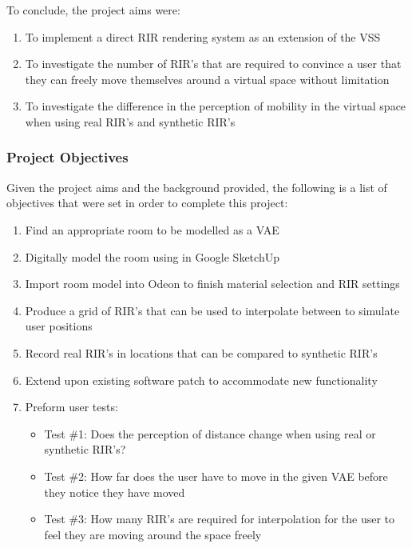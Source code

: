 \documentclass[../../main.tex]{subfiles}
\begin{document}
		To conclude, the project aims were:

		\begin{enumerate}
			\item To implement a direct \ac{RIR} rendering system as an extension of the \ac{VSS}

			\item To investigate the number of \ac{RIR}'s that are required to convince a user that they can freely move themselves around a virtual space without limitation

			\item To investigate the difference in the perception of mobility in the virtual space when using real \ac{RIR}'s and synthetic \ac{RIR}'s
		\end{enumerate}

	\subsubsection{Project Objectives}
	\label{background:objectives}

		Given the project aims and the background provided, the following is a list of objectives that were set in order to complete this project:

		\begin{enumerate}
			\item Find an appropriate room to be modelled as a \ac{VAE} 
			\item Digitally model the room using in Google SketchUp
			\item Import room model into Odeon to finish material selection and \ac{RIR} settings
			\item Produce a grid of \ac{RIR}'s that can be used to interpolate between to simulate user positions
			\item Record real \ac{RIR}'s in locations that can be compared to synthetic \ac{RIR}'s
			\item Extend upon existing software patch to accommodate new functionality
			\item Preform user tests:
				\begin{itemize}
					\item Test \#1: Does the perception of distance change when using real or synthetic \ac{RIR}'s?
					\item Test \#2: How far does the user have to move in the given \ac{VAE} before they notice they have moved 
					\item Test \#3: How many \ac{RIR}'s are required for interpolation for the user to feel they are moving around the space freely
				\end{itemize}
			\end{enumerate}
\end{document}
